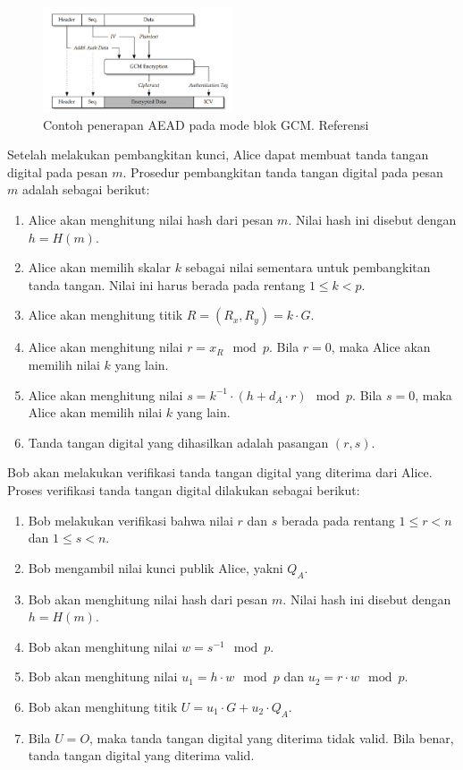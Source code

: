 \documentclass[conference]{IEEEtran}
\begin{document}
\begin{figure}[htbp]
    \centerline{\includegraphics[width=0.5\textwidth]{res/aead.example.png}}
    \caption{Contoh penerapan AEAD pada mode blok GCM. Referensi \cite{b6}}
    \label{fig:aead.example}
\end{figure}

Setelah melakukan pembangkitan kunci, Alice dapat membuat tanda tangan digital pada pesan $m$. Prosedur pembangkitan tanda tangan digital pada pesan $m$ adalah sebagai berikut:

\begin{enumerate}
    \item Alice akan menghitung nilai hash dari pesan $m$. Nilai hash ini disebut dengan $h = H(m)$.
    \item Alice akan memilih skalar $k$ sebagai nilai sementara untuk pembangkitan tanda tangan. Nilai ini harus berada pada rentang $1 \le k < p$.
    \item Alice akan menghitung titik $R = (R_x, R_y) = k \cdot G$. 
    \item Alice akan menghitung nilai $r = x_R \mod p$. Bila $r = 0$, maka Alice akan memilih nilai $k$ yang lain.
    \item Alice akan menghitung nilai $s = k^{-1} \cdot (h + d_A \cdot r) \mod p$. Bila $s = 0$, maka Alice akan memilih nilai $k$ yang lain.
    \item Tanda tangan digital yang dihasilkan adalah pasangan $(r, s)$.
\end{enumerate}

Bob akan melakukan verifikasi tanda tangan digital yang diterima dari Alice. Proses verifikasi tanda tangan digital dilakukan sebagai berikut:

\begin{enumerate}
    \item Bob melakukan verifikasi bahwa nilai $r$ dan $s$ berada pada rentang $1 \le r < n$ dan $1 \le s < n$.
    \item Bob mengambil nilai kunci publik Alice, yakni $Q_A$.
    \item Bob akan menghitung nilai hash dari pesan $m$. Nilai hash ini disebut dengan $h = H(m)$.
    \item Bob akan menghitung nilai $w = s^{-1} \mod p$.
    \item Bob akan menghitung nilai $u_1 = h \cdot w \mod p$ dan $u_2 = r \cdot w \mod p$.
    \item Bob akan menghitung titik $U = u_1 \cdot G + u_2 \cdot Q_A$.
    \item Bila $U = O$, maka tanda tangan digital yang diterima tidak valid. Bila benar, tanda tangan digital yang diterima valid.
\end{enumerate}
\end{document}
